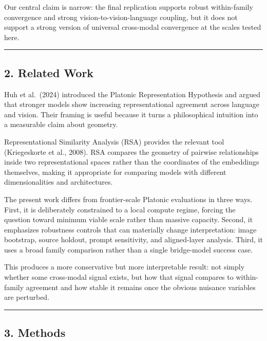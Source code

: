 \documentclass[
]{article}
\begin{document}
Our central claim is narrow: the final replication supports robust
within-family convergence and strong vision-to-vision-language coupling,
but it does not support a strong version of universal cross-modal
convergence at the scales tested here.

\begin{center}\rule{0.5\linewidth}{0.5pt}\end{center}

\subsection{2. Related Work}\label{related-work}

Huh et al.~(2024) introduced the Platonic Representation Hypothesis and
argued that stronger models show increasing representational agreement
across language and vision. Their framing is useful because it turns a
philosophical intuition into a measurable claim about geometry.

Representational Similarity Analysis (RSA) provides the relevant tool
(Kriegeskorte et al., 2008). RSA compares the geometry of pairwise
relationships inside two representational spaces rather than the
coordinates of the embeddings themselves, making it appropriate for
comparing models with different dimensionalities and architectures.

The present work differs from frontier-scale Platonic evaluations in
three ways. First, it is deliberately constrained to a local compute
regime, forcing the question toward minimum viable scale rather than
massive capacity. Second, it emphasizes robustness controls that can
materially change interpretation: image bootstrap, source holdout,
prompt sensitivity, and aligned-layer analysis. Third, it uses a broad
family comparison rather than a single bridge-model success case.

This produces a more conservative but more interpretable result: not
simply whether some cross-modal signal exists, but how that signal
compares to within-family agreement and how stable it remains once the
obvious nuisance variables are perturbed.

\begin{center}\rule{0.5\linewidth}{0.5pt}\end{center}

\subsection{3. Methods}\label{methods}
\end{document}
